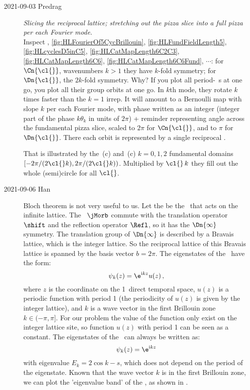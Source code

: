 \begin{description}
\item[2021-09-03 Predrag]
\emph{Slicing the reciprocal lattice; stretching out
the pizza slice into a full pizza per each Fourier mode.}
\\
Inspect
,
\ref{fig:HLFourierOf5CycBrillouin},
\ref{fig:HLFundFieldLength5},
\ref{fig:HLcyclesD5inC5},
\ref{fig:HLCatMapLength6C2C3},
\ref{fig:HLCatMapLength6C6},
\ref{fig:HLCatMapLength6C6Fund},
$\cdots$:
for  $\Cn{\cl{}}$, wavenumbers $k>1$ they have $k$-fold symmetry; for
$\Dn{\cl{}}$, the $2k$-fold symmetry. Why? If you plot all period-\cl{}\
{\lattstate}s at one go, you plot all their group orbits at one go. In
$k$th mode, they rotate $k$ times faster than the $k=1$ irrep.
It will amount to a Bernoulli map
with slope $k$ per each Fourier mode, with phase written as an integer
(integer part of the phase $k\theta_k$ in units of $2\pi$) + reminder
representing angle across the fundamental pizza slice, scaled to $2\pi$
for $\Cn{\cl{}}$, and to $\pi$ for $\Dn{\cl{}}$. There each orbit is
represented by a single reciprocal {\lattstate}.

That is illustrated by the  \,(c)
and \Dn{5} \reffig{fig:HLcyclesD5inC5}\,(c) $k=0,1,2$ fundamental domains
$[-2\pi/(2\cl{}k),2\pi/(2\cl{}k))$. Multiplied by $\cl{}\,k$ they fill
out the whole (semi)circle for all $\cl{}$.

\item[2021-09-06 Han]
Bloch theorem is not very useful to us. Let the  be the
\jacobianOrb\ that acts on the infinite lattice. The \jacobianOrb\ $\jMorb$
commute with the translation operator $\shift$ and the reflection operator
$\Refl$, so it has the $\Dn{\infty}$ symmetry. The translation group of $\Dn{\infty}$
is described by a Bravais lattice, which is the integer lattice. So the reciprocal lattice
of this Bravais lattice is spanned by the basis vector $b = 2 \pi$. The eigenstates of
the \jacobianOrb\ have the form:
\[
\psi_k(z) = \e^{\mathrm{i}kz}u(z) \, ,
\]
where $z$ is the coordinate on the 1\dmn\ direct temporal space,
$u(z)$ is a periodic function with
period 1 (the periodicity of $u(z)$ is given by the integer lattice), and $k$ is a wave vector
in the first Brillouin zone $k \in (-\pi,\pi]$. For our problem the value of the function
only exist on the integer lattice site, so function $u(z)$ with period 1 can be seen as
a constant. The eigenstates of the \jacobianOrb\ can always be written as:
\[
\psi_k(z) = \e^{\mathrm{i}kz}
\]
with eigenvalue $E_k=2\cos k - s$, which does not depend on the period of the eigenstate.
Known that the wave vector $k$ is in the first Brillouin zone, we can plot the
'eigenvalue band' of the \jacobianOrb, as shown in \reffig{fig:HLTemplattBand}.


\end{description}
